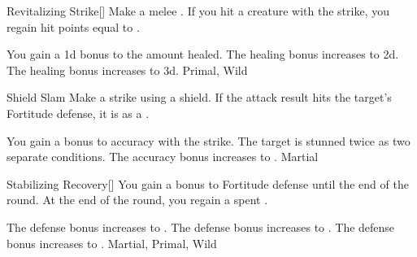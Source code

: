 \lowercase{\hypertarget{maneuver:Revitalizing Strike}{}}\label{maneuver:Revitalizing Strike}
\begin{apability}{\hypertarget{maneuver:Revitalizing Strike}{Revitalizing Strike}}[]
Make a melee .
If you hit a creature with the strike, you regain hit points equal to .

\rankline
{} You gain a \plus1d bonus to the amount healed.
 The healing bonus increases to \plus2d.
 The healing bonus increases to \plus3d.
 Primal, Wild
\end{apability}
\vspace{0.25em}



\lowercase{\hypertarget{maneuver:Shield Slam}{}}\label{maneuver:Shield Slam}
\begin{apability}{\hypertarget{maneuver:Shield Slam}{Shield Slam}}
Make a strike using a shield.
If the attack result hits the target's Fortitude defense,
it is  as a .

\rankline
{} You gain a  bonus to accuracy with the strike.
 The target is stunned twice as two separate conditions.
 The accuracy bonus increases to .
 Martial
\end{apability}
\vspace{0.25em}



\lowercase{\hypertarget{maneuver:Stabilizing Recovery}{}}\label{maneuver:Stabilizing Recovery}
\begin{freeability}{\hypertarget{maneuver:Stabilizing Recovery}{Stabilizing Recovery}}[]
You gain a  bonus to Fortitude defense until the end of the round.
At the end of the round, you regain a spent .

\rankline
{} The defense bonus increases to .
 The defense bonus increases to .
 The defense bonus increases to .
 Martial, Primal, Wild
\end{freeability}
\vspace{0.25em}



